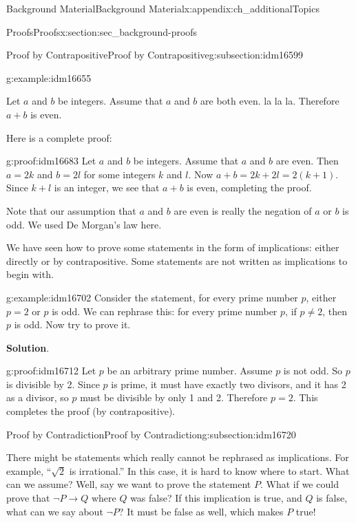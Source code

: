 \documentclass[oneside,10pt,]{book}
\numberwithin{equation}{chapter}
\def\imp{\rightarrow}
\begin{document}
\begin{appendixptx}{Background Material}{}{Background Material}{}{}{x:appendix:ch_additionalTopics}
\begin{sectionptx}{Proofs}{}{Proofs}{}{}{x:section:sec_background-proofs}
\begin{subsectionptx}{Proof by Contrapositive}{}{Proof by Contrapositive}{}{}{g:subsection:idm16599}
\begin{example}{}{g:example:idm16655}
\par
Let \(a\) and \(b\) be integers. Assume that \(a\) and \(b\) are both even. la la la. Therefore \(a+b\) is even.%
\par
Here is a complete proof:%
\begin{proofptx}{}{g:proof:idm16683}
Let \(a\) and \(b\) be integers. Assume that \(a\) and \(b\) are even. Then \(a = 2k\) and \(b = 2l\) for some integers \(k\) and \(l\). Now \(a + b = 2k + 2l = 2(k+1)\). Since \(k + l\) is an integer, we see that \(a + b\) is even, completing the proof.%
\end{proofptx}
Note that our assumption that \(a\) and \(b\) are even is really the negation of \(a\) or \(b\) is odd. We used De Morgan's law here.%
\end{example}
We have seen how to prove some statements in the form of implications: either directly or by contrapositive. Some statements are not written as implications to begin with.%
\begin{example}{}{g:example:idm16702}%
Consider the statement, for every prime number \(p\), either \(p = 2\) or \(p\) is odd. We can rephrase this: for every prime number \(p\), if \(p \ne 2\), then \(p\) is odd. Now try to prove it.%
\par\smallskip%
\noindent\textbf{Solution}.\hypertarget{g:solution:idm16711}{}\quad{}\begin{proofptx}{}{g:proof:idm16712}
Let \(p\) be an arbitrary prime number. Assume \(p\) is not odd. So \(p\) is divisible by 2. Since \(p\) is prime, it must have exactly two divisors, and it has 2 as a divisor, so \(p\) must be divisible by only 1 and 2. Therefore \(p = 2\). This completes the proof (by contrapositive).%
\end{proofptx}
\end{example}
\end{subsectionptx}
%
%
\typeout{************************************************}
\typeout{************************************************}
%
\begin{subsectionptx}{Proof by Contradiction}{}{Proof by Contradiction}{}{}{g:subsection:idm16720}
%
\par
There might be statements which really cannot be rephrased as implications. For example, ``\(\sqrt 2\) is irrational.'' In this case, it is hard to know where to start. What can we assume? Well, say we want to prove the statement \(P\). What if we could prove that \(\neg P \imp Q\) where \(Q\) was false? If this implication is true, and \(Q\) is false, what can we say about \(\neg P\)? It must be false as well, which makes \(P\) true!%

\end{subsectionptx}
\end{sectionptx}
\end{appendixptx}
\end{document}
